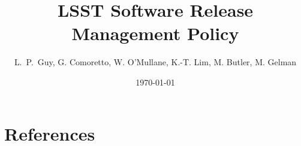 \documentclass[DM,lsstdraft,toc]{lsstdoc}
\title{LSST Software \gls{Release} Management Policy}
\author{%
L.~P.~Guy, G. Comoretto, W. O'Mullane, K.-T. Lim, M. \gls{Butler}, M. Gelman
}
\date{\today}
\begin{document}
\maketitle



\newpage


%

\appendix

%

\section{References} \label{sec:bib}


\printglossaries
\end{document}
